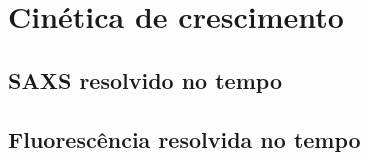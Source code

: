 	
\part{Cinética de crescimento}
	\chapter{SAXS resolvido no tempo}
	\chapter{Fluorescência resolvida no tempo}